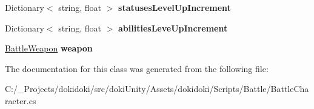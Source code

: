 \begin{DoxyCompactItemize}
\item 
Dictionary$<$ string, float $>$ {\bfseries statuses\+Level\+Up\+Increment}\hypertarget{class_battle_character_af27640d38720d42ef40751071634e9c9}{}\label{class_battle_character_af27640d38720d42ef40751071634e9c9}

\item 
Dictionary$<$ string, float $>$ {\bfseries abilities\+Leve\+Up\+Increment}\hypertarget{class_battle_character_afacdd007931886034437179d4f4cb28e}{}\label{class_battle_character_afacdd007931886034437179d4f4cb28e}

\item 
\hyperlink{class_battle_weapon}{Battle\+Weapon} {\bfseries weapon}\hypertarget{class_battle_character_a025e99a16b9839f65c8e6565df60e866}{}\label{class_battle_character_a025e99a16b9839f65c8e6565df60e866}

\end{DoxyCompactItemize}


The documentation for this class was generated from the following file\+:\begin{DoxyCompactItemize}
\item 
C\+:/\+\_\+\+Projects/dokidoki/src/doki\+Unity/\+Assets/dokidoki/\+Scripts/\+Battle/Battle\+Character.\+cs\end{DoxyCompactItemize}
